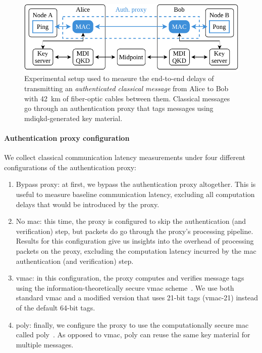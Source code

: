 \begin{figure}[t]
    \centering
    \includegraphics[width=0.6\linewidth]{figures/mac-setup-diagram.pdf}
    \caption{
        Experimental setup used to measure the end-to-end delays of transmitting an
        \emph{authenticated classical message} from Alice to Bob with \qty{42}{\km} of fiber-optic
        cables between them. Classical messages go through an authentication proxy that tags
        messages using \acrshort{mdiqkd}-generated key material.
    }
    \label{fig:mac-setup-diagram}
\end{figure}

\paragraph{Authentication proxy configuration}

We collect classical communication latency measurements under four different configurations of the
authentication proxy:

\begin{enumerate}
    \item Bypass proxy: at first, we bypass the authentication proxy altogether. This is useful to
          measure baseline communication latency, excluding all computation delays that would be
          introduced by the proxy.
    \item No \acrshort{mac}: this time, the proxy is configured to skip the authentication (and
          verification) step, but packets do go through the proxy's processing pipeline. Results for
          this configuration give us insights into the overhead of processing packets on the proxy,
          excluding the computation latency incurred by the \acrshort{mac} authentication (and
          verification) step.
    \item \acrshort{vmac}: in this configuration, the proxy computes and verifies message tags using
          the information-theoretically secure \acrshort{vmac} scheme~\cite{krovetz_2007_message}.
          We use both standard \acrshort{vmac} and a modified version that uses 21-bit tags
          (\acrshort{vmac}-21) instead of the default 64-bit tags.
    \item \acrshort{poly}: finally, we configure the proxy to use the computationally secure
          \acrshort{mac} called \acrshort{poly}~\cite{bernstein_2005_poly1305}. As opposed to
          \acrshort{vmac}, \acrshort{poly} can reuse the same key material for multiple messages.
\end{enumerate}

